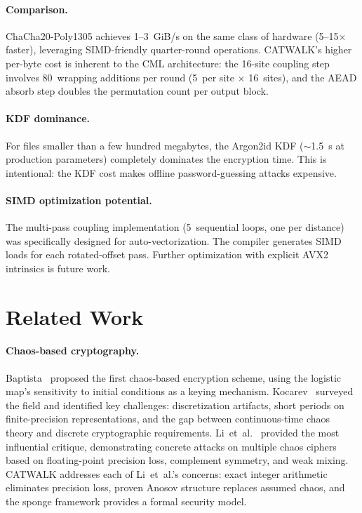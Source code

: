 \documentclass[runningheads]{llncs}
\begin{document}
\paragraph{Comparison.}
ChaCha20-Poly1305 achieves 1--3~GiB/s on the same class of hardware (5--15$\times$
faster), leveraging SIMD-friendly quarter-round operations.  CATWALK's higher
per-byte cost is inherent to the CML architecture: the 16-site coupling step
involves 80~wrapping additions per round (5~per site $\times$ 16~sites), and the
AEAD absorb step doubles the permutation count per output block.

\paragraph{KDF dominance.}
For files smaller than a few hundred megabytes, the Argon2id KDF ($\sim$1.5~s
at production parameters) completely dominates the encryption time.  This is
intentional: the KDF cost makes offline password-guessing attacks expensive.

\paragraph{SIMD optimization potential.}
The multi-pass coupling implementation (5~sequential loops, one per distance)
was specifically designed for auto-vectorization.  The compiler generates
SIMD loads for each rotated-offset pass.  Further optimization with explicit
AVX2 intrinsics is future work.

\section{Related Work}
\label{sec:related}

\paragraph{Chaos-based cryptography.}
Baptista~\cite{baptista1998cryptography} proposed the first chaos-based
encryption scheme, using the logistic map's sensitivity to initial conditions
as a keying mechanism.  Kocarev~\cite{kocarev2001chaos} surveyed the field
and identified key challenges: discretization artifacts, short periods on
finite-precision representations, and the gap between continuous-time chaos
theory and discrete cryptographic requirements.
Li~et~al.~\cite{li2001problems} provided the most influential critique,
demonstrating concrete attacks on multiple chaos ciphers based on
floating-point precision loss, complement symmetry, and weak mixing.
CATWALK addresses each of Li~et~al.'s concerns: exact integer arithmetic
eliminates precision loss, proven Anosov structure replaces assumed chaos,
and the sponge framework provides a formal security model.
\end{document}
